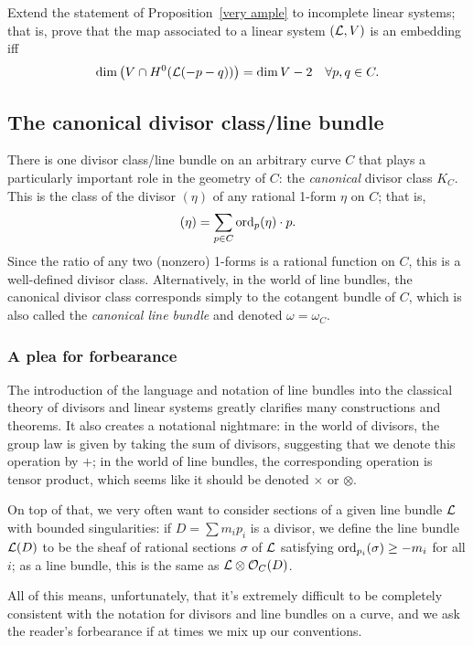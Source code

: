 \begin{exercise}
Extend the statement of Proposition~\ref{very ample} to incomplete linear systems; that is, prove that the map associated to a linear system $(\cL, V)$ is an embedding iff
$$
\dim\big( V \cap H^0(\cL(-p-q))\big) = \dim V - 2 \quad \forall p, q \in C.
$$
\end{exercise}

\subsection{The canonical divisor class/line bundle}

There is one divisor class/line bundle on an arbitrary curve $C$ that plays a particularly important role in the geometry of $C$: the \emph{canonical} divisor class $K_C$. This is the class of the divisor $(\eta)$ of any rational 1-form $\eta$ on $C$; that is,
$$
(\eta) = \sum_{p \in C} \ord_p(\eta)\cdot p.
$$
Since the ratio of any two (nonzero) 1-forms is a rational function on $C$, this is a well-defined divisor class. Alternatively, in the world of line bundles, the canonical divisor class corresponds simply to the cotangent bundle of $C$, which is also called the \emph{canonical line bundle} and denoted $\omega = \omega_C$.

\subsubsection{A plea for forbearance} 

The introduction of the language and notation of line bundles into the classical theory of divisors and linear systems greatly clarifies many constructions and theorems. It also creates a notational nightmare: in the world of divisors, the group law is given by taking the sum of divisors, suggesting that we denote this operation by $+$; in the world of line bundles, the corresponding operation is tensor product, which seems like it should be denoted $\times$ or $\otimes$.

On top of that, we very often want to consider sections of a given line bundle $\cL$ with bounded singularities: if $D = \sum m_ip_i$ is a divisor, we define the line bundle $\cL(D)$ to be the sheaf of rational sections $\sigma$ of $\cL$ satisfying $\ord_{p_i}(\sigma) \geq -m_i$ for all $i$; as a line bundle, this is the same as $\cL \otimes \cO_C(D)$.

All of this means, unfortunately, that it's extremely difficult to be completely consistent with the notation for divisors and line bundles on a curve, and we ask the reader's forbearance if at times we mix up our conventions.





